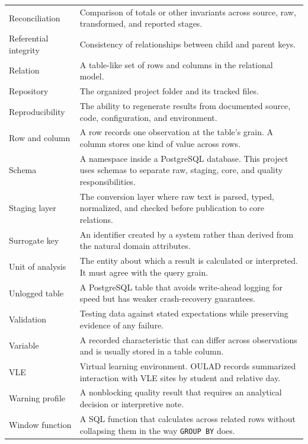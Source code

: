 \begin{longtable}{@{}p{}p{}@{}}
Reconciliation &
Comparison of totals or other invariants across source, raw, transformed, and
reported stages. \\
Referential integrity &
Consistency of relationships between child and parent keys. \\
Relation &
A table-like set of rows and columns in the relational model. \\
Repository &
The organized project folder and its tracked files. \\
Reproducibility &
The ability to regenerate results from documented source, code,
configuration, and environment. \\
Row and column &
A row records one observation at the table's grain. A column stores one kind
of value across rows. \\
Schema &
A namespace inside a PostgreSQL database. This project uses schemas to separate
raw, staging, core, and quality responsibilities. \\
Staging layer &
The conversion layer where raw text is parsed, typed, normalized, and checked
before publication to core relations. \\
Surrogate key &
An identifier created by a system rather than derived from the natural domain
attributes. \\
Unit of analysis &
The entity about which a result is calculated or interpreted. It must agree
with the query grain. \\
Unlogged table &
A PostgreSQL table that avoids write-ahead logging for speed but has weaker
crash-recovery guarantees. \\
Validation &
Testing data against stated expectations while preserving evidence of any
failure. \\
Variable &
A recorded characteristic that can differ across observations and is usually
stored in a table column. \\
VLE &
Virtual learning environment. OULAD records summarized interaction with VLE
sites by student and relative day. \\
Warning profile &
A nonblocking quality result that requires an analytical decision or
interpretive note. \\
Window function &
A SQL function that calculates across related rows without collapsing them in
the way \texttt{GROUP BY} does. \\
\end{longtable}
